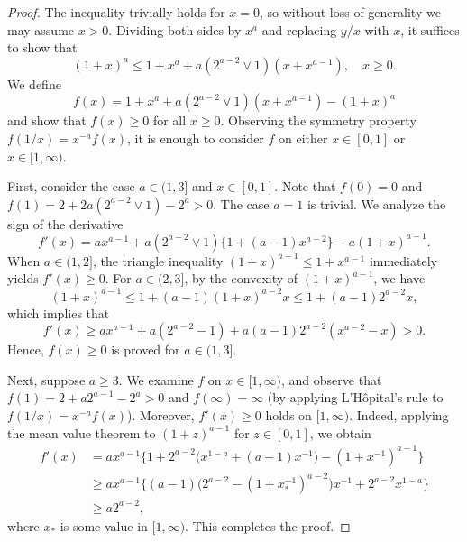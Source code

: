\documentclass[11pt,a4,leqno]{amsart}
\newcommand{\1}{{\mathbf 1}}
\begin{document}
\begin{proof}
The inequality trivially holds for $x=0$, so without loss of generality we may assume $x>0$. 
Dividing both sides by $x^a$ and replacing $y/x$ with $x$, it suffices to show that
\[
(1+x)^a \le 1+x^a + a(2^{a-2}\vee 1) (x+x^{a-1}),\quad x\ge 0.
\]
We define 
\[
f(x) = 1+ x^a +a(2^{a-2}\vee 1)(x+x^{a-1}) -(1+x)^a
\]
and show that $f(x)\ge 0$ for all $x\ge 0$. Observing the symmetry property 
$f(1/x)=x^{-a}f(x)$, it is enough to consider $f$ on either $x\in [0,1]$ or $x\in [1,\infty)$. 

First, consider the case $a\in (1,3]$ and $x\in [0,1]$. Note that $f(0)=0$ and $f(1)=2+2a(2^{a-2}\vee 1)-2^a>0$. The case $a=1$ is trivial. 
We analyze the sign of the derivative
\[
f'(x) = a x^{a-1} + a(2^{a-2}\vee 1)\{1+(a-1) x^{a-2}\}-a(1+x)^{a-1}. 
\]
When $a \in (1,2]$, the triangle inequality $(1+x)^{a-1} \le 1+ x^{a-1}$ immediately yields $f'(x) \ge 0$. 
For $a \in (2,3]$, by the convexity of $(1+x)^{a-1}$, we have 
\[
(1+x)^{a-1} \le 1 +(a-1)(1+x)^{a-2} x \le 1+(a-1) 2^{a-2} x,
\]
which implies that
\[
f'(x) \ge a x^{a-1}+ a(2^{a-2}-1)+a(a-1) 2^{a-2} (x^{a-2}-x) >0.
\]
Hence, $f(x)\ge 0$ is proved for $a\in (1,3]$.

Next, suppose $a \ge 3$. We examine $f$ on $x\in [1,\infty)$, and observe that 
$f(1)= 2+a2^{a-1}-2^a>0$ and $f(\infty)=\infty$ (by applying L'H\^opital's rule to $f(1/x)=x^{-a}f(x)$). 
Moreover, $f'(x)\ge 0$ holds on $[1,\infty)$. Indeed, applying the mean value theorem to $(1+z)^{a-1}$ for $z\in [0,1]$, we obtain 
\begin{align*}
f'(x) &= a x^{a-1} \Big\{
1+2^{a-2}\big(x^{1-a}+(a-1)x^{-1}\big)-(1+x^{-1})^{a-1}
\Big\} \\
&\ge a x^{a-1} \Big\{
(a-1) \big(2^{a-2} -(1+x_\ast^{-1})^{a-2}\big)x^{-1} + 2^{a-2}x^{1-a}
\Big\} \\
& \ge a 2^{a-2}, 
\end{align*} 
where $x_\ast$ is some value in $[1,\infty)$. This completes the proof.
\end{proof}
\end{document}
